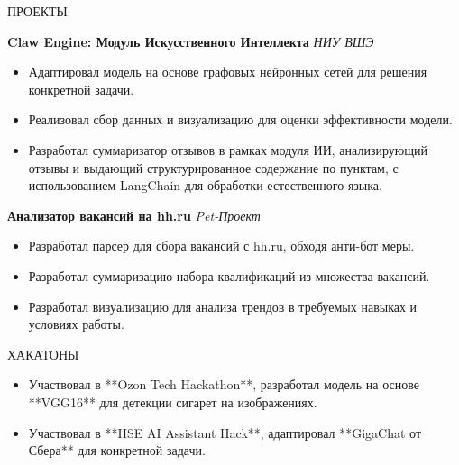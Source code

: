 \documentclass{resume}
\begin{document}
\begin{rSection}{ПРОЕКТЫ}

\textbf{Claw Engine: Модуль Искусственного Интеллекта}  
\textit{НИУ ВШЭ}  
\begin{itemize}
    \itemsep -3pt {} 
    \item Адаптировал модель на основе графовых нейронных сетей для решения конкретной задачи.
    \item Реализовал сбор данных и визуализацию для оценки эффективности модели.
    \item Разработал суммаризатор отзывов в рамках модуля ИИ, анализирующий отзывы и выдающий структурированное содержание по пунктам, с использованием LangChain для обработки естественного языка.
\end{itemize}

\textbf{Анализатор вакансий на hh.ru}  
\textit{Pet-Проект}  
\begin{itemize}
    \itemsep -3pt {} 
    \item Разработал парсер для сбора вакансий с hh.ru, обходя анти-бот меры.
    \item Разработал суммаризацию набора квалификаций из множества вакансий.
    \item Разработал визуализацию для анализа трендов в требуемых навыках и условиях работы.
\end{itemize}

\end{rSection}

\begin{rSection}{ХАКАТОНЫ}
\begin{itemize}
    \itemsep -3pt {} 
    \item Участвовал в **Ozon Tech Hackathon**, разработал модель на основе **VGG16** для детекции сигарет на изображениях.
    \item Участвовал в **HSE AI Assistant Hack**, адаптировал **GigaChat от Сбера** для конкретной задачи.
\end{itemize}
\end{rSection}
\end{document}
